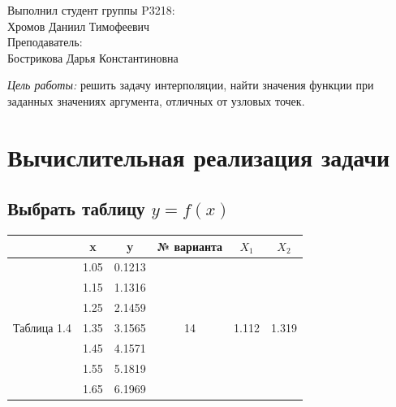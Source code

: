 \documentclass[12pt]{article}
\begin{document}
\pagestyle{fancy}
\thispagestyle{first style}


\vspace{25mm}


\vspace{50mm}

\begin{flushright}
Выполнил студент группы P3218:\\Хромов Даниил Тимофеевич\\
\vspace{5mm}
Преподаватель:\\Бострикова Дарья Константиновна\\
\end{flushright}

\newpage

\pagestyle{empty}
\raggedright

\textit{Цель работы:} решить задачу интерполяции, найти значения функции при заданных значениях аргумента, отличных от узловых точек.\\

\section{Вычислительная реализация задачи}

\subsection{Выбрать таблицу $y = f(x)$}
\begin{center}
\begin{tabular}{|c|c|c|c|c|c|}
  \hline
  \multicolumn{1}{|c|}{} & x & y & № варианта & $X_1$ & $X_2$ \\
  \hline
  \multirow{7}{*}{Таблица 1.4} 
  & 1.05 & 0.1213 & \multirow{7}{*}{14} & \multirow{7}{*}{1.112} & \multirow{7}{*}{1.319} \\
  & 1.15 & 1.1316 & & & \\
  & 1.25 & 2.1459 & & & \\
  & 1.35 & 3.1565 & & & \\
  & 1.45 & 4.1571 & & & \\
  & 1.55 & 5.1819 & & & \\
  & 1.65 & 6.1969 & & & \\
  \hline
\end{tabular}
\end{center}
\end{document}
